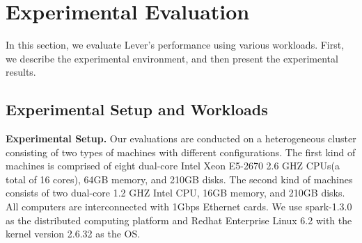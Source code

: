 \section{Experimental Evaluation}

  In this section, we evaluate Lever's performance using various workloads. First, we describe the experimental environment, and then present the experimental results.

\subsection{Experimental Setup and Workloads}

  \textbf{Experimental Setup.} Our evaluations are conducted on a heterogeneous cluster consisting of two types of machines with different configurations. The first kind of machines is comprised of eight dual-core Intel Xeon E5-2670 2.6 GHZ CPUs(a total of 16 cores), 64GB memory, and 210GB disks. The second kind of machines consists of two dual-core 1.2 GHZ Intel CPU, 16GB memory, and 210GB disks. All computers are interconnected with 1Gbps Ethernet cards. We use spark-1.3.0 as the distributed computing platform and Redhat Enterprise Linux 6.2 with the kernel version 2.6.32 as the OS.

